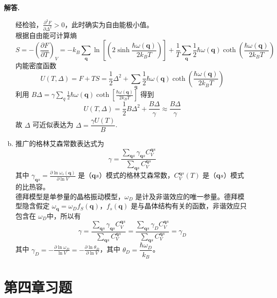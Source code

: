 \documentclass[11pt]{ctexart}
\newenvironment{solution}{\par\noindent\textbf{解答. }}{\par}
\begin{document}
\begin{solution}
\begin{enumerate}[(a)]
              经检验，$\displaystyle \frac{\partial^2 F}{\partial \Delta^2} > 0$，此时确实为自由能极小值。 \\[12pt]
              根据自由能可计算熵
              $$S = -\left(\frac{\partial F}{\partial T}\right)_V = -k_B\sum_{\mathbf{q}}\ln{\left[\left(2\sinh{\frac{\hbar\omega(\mathbf{q})}{2k_BT}}\right)\right]} + \frac{1}{T}\sum_{\mathbf{q}}\frac{1}{2}\hbar\omega(\mathbf{q})\coth{\left(\frac{\hbar\omega(\mathbf{q})}{2k_BT}\right)}$$
              内能密度函数
              $$U(T,\Delta) = F + TS = \frac{1}{2}\Delta^2 + \sum_{\mathbf{q}}\frac{1}{2}\hbar\omega(\mathbf{q})\coth{\left(\frac{\hbar\omega(\mathbf{q})}{2k_BT}\right)}$$
              利用 $\displaystyle B\Delta = \gamma\sum_{q}\frac{1}{2}\hbar\omega(\mathbf{q})\coth{\left[\frac{\hbar\omega(\mathbf{q})}{2k_BT}\right]}$ 得到
              $$U(T,\Delta) = \frac{1}{2}B\Delta^2 + \frac{B\Delta}{\gamma} \approx \frac{B\Delta}{\gamma}$$
              故  $\Delta$ 可近似表达为 $\Delta = \dfrac{\gamma U(T)}{B}$.
        \item 推广的格林艾森常数表达式为 
              $$\gamma = \frac{\displaystyle\sum_{\mathbf{q}s}\gamma_{\mathbf{q}s}C_V^{\mathbf{q}s}}{\displaystyle\sum_{\mathbf{q}s}C_V^{\mathbf{q}s}}$$
              其中 $\displaystyle\gamma_{\mathbf{q}s} = \frac{\partial\ln{\omega_s(\mathbf{q})}}{\partial\ln{V}}$ 是（$\mathbf{q}s$）模式的格林艾森常数，$\displaystyle C_V^{\mathbf{q}s}(T)$ 是（$\mathbf{q}s$）模式的比热容。 \\[12pt]
              德拜模型是单参量的晶格振动模型，$\omega_D$ 是计及非谐效应的唯一参量。德拜模型隐含假定 $\omega_{\mathbf{q}} = \omega_Df_S(\mathbf{q})$，$f_s(\mathbf{q})$ 是与晶体结构有关的函数，非谐效应只包含在 $\omega_D$中，所以有
              $$\gamma = \frac{\displaystyle\sum_{\mathbf{q}s}\gamma_{\mathbf{q}s}C_V^{\mathbf{q}s}}{\displaystyle\sum_{\mathbf{q}s}C_V^{\mathbf{q}s}} = \frac{\displaystyle\sum_{\mathbf{q}s}\gamma_{D}C_V^{\mathbf{q}s}}{\displaystyle\sum_{\mathbf{q}s}C_V^{\mathbf{q}s}} = \gamma_D$$
              其中 $\displaystyle\gamma_D = -\frac{\partial\ln{\omega_D}}{\ln{V}} = - \frac{\partial \ln{\theta_D}}{\partial\ln{V}}$，其中 $\theta_D = \dfrac{\hbar\omega_D}{k_B}$。
    \end{enumerate}
\end{solution}

\newpage
\section{第四章习题}
\end{document}

